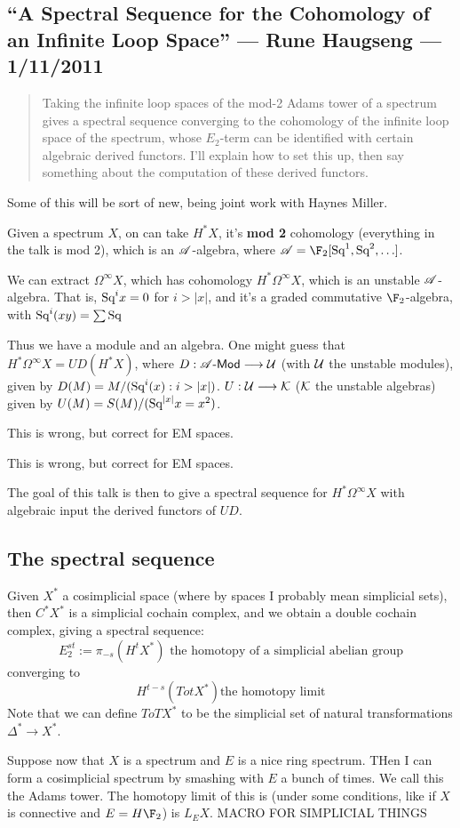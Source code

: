 \documentclass[11pt]{article}
\newcommand{\KanSemResponse}[1]
{
\thispagestyle{fancy}
\subsection*{#1}
}
\begin{document}
\begin{RuneBabytop}
\KanSemResponse
{``A Spectral Sequence for the Cohomology of an Infinite Loop Space'' --- Rune Haugseng --- 1/11/2011}
\begin{abstract}
Taking the infinite loop spaces of the mod-2 Adams tower of a
spectrum gives a spectral sequence converging to the cohomology of the
infinite loop space of the spectrum, whose $E_2$-term can be identified with
certain algebraic derived functors. I'll explain how to set this up, then
say something about the computation of these derived functors.
\end{abstract}
Some of this will be sort of new, being joint work with Haynes Miller.

Given a spectrum $X$, on can take $H^*X$, it's \textbf{mod 2} cohomology (everything in the talk is mod 2), which is an $\mathscr{A}$-algebra, where $\Steen=\F_2[\Squ^1,\Squ^2,\ldots]$.

We can extract $\Omega^\infty X$, which has cohomology $H^*\Omega^\infty X$, which is an unstable $\mathscr{A}$-algebra. That is, $\textup{Sq}^ix=0$ for $i>|x|$, and it's a graded commutative $\F_2$-algebra, with $\textup{Sq}^i(xy)=\sum\textup{Sq}$ 

Thus we have a module and an algebra. One might guess that $H^*\Omega^\infty X=UD(H^*X)$, where $D:\mathscr{A}\operatorname{{\mathsf{\!-Mod}}}\longrightarrow\mathcal{U}$ (with $\mathcal{U}$ the unstable modules), given by $D(M)=M/(\textup{Sq}^i(x):i>|x|)$. $U:\mathcal{U}\longrightarrow\mathcal{K}$ ($\mathcal{K}$ the unstable algebras) given by $U(M)=S(M)/(\textup{Sq}^{|x|}x=x^2)$.

This is wrong, but correct for EM spaces.
\begin{thm*}
This is wrong, but correct for EM spaces.
\end{thm*}
The goal of this talk is then to give a spectral sequence for $H^*\Omega^\infty X$ with algebraic input the derived functors of $UD$.
\subsection*{The spectral sequence}
Given $X^*$ a cosimplicial space (where by spaces I probably mean simplicial sets), then $C^*X^*$ is a simplicial cochain complex, and we obtain a double cochain complex, giving a spectral sequence:
\[E_2^{st}:=\pi_{-s}(H^tX^*)\text{ the homotopy of a simplicial abelian group}\]
converging to
\[H^{t-s}(Tot X^*)\text{the homotopy limit}\]
Note that we can define $ToT X^*$ to be the simplicial set of natural transformations $\Delta^*\to X^*$.

Suppose now that $X$ is a spectrum and $E$ is a nice ring spectrum. THen I can form a cosimplicial spectrum by smashing with $E$ a bunch of times. We call this the Adams tower. The homotopy limit of this is (under some conditions, like if $X$ is connective and $E=H\F_2$) is $L_EX$.
MACRO FOR SIMPLICIAL THINGS


\end{RuneBabytop}
\end{document}
